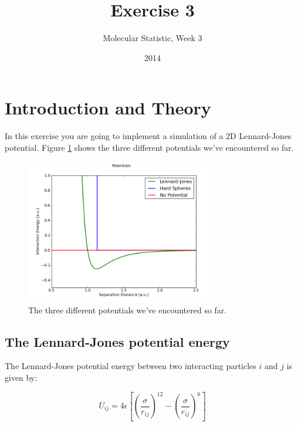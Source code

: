 \documentclass{article}
\title{Exercise 3}
\author{Molecular Statistic, Week 3}
\date{2014}
\begin{document}

\maketitle


\section{Introduction and Theory}

In this exercise you are going to implement a simulation of a 2D Lennard-Jones
potential. Figure \ref{fig:potentials} shows the three different potentials
we've encountered so far.

    \begin{figure}[h!]
    \begin{center}
        \includegraphics[width=0.75\textwidth]{potentials.png}
        \caption{The three different potentials we've encountered so far.}
        \label{fig:potentials}
    \end{center}
    \end{figure}


\subsection{The Lennard-Jones potential energy}

The Lennard-Jones potential energy between two interacting particles $i$ and
$j$ is given by:

\begin{equation}
    U_{ij} = 4 \epsilon \left[ \left(\frac{\sigma}{r_{ij}} \right)^{12} - \left(\frac{\sigma}{r_{ij}} \right)^6 \right]
\end{equation}
\end{document}
